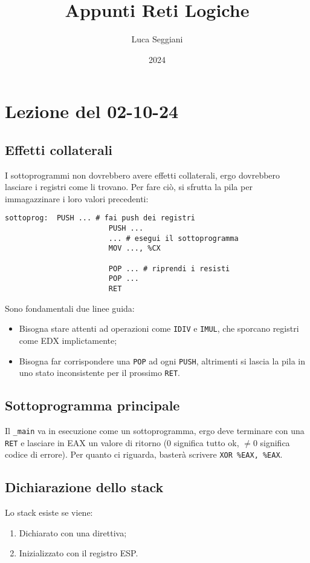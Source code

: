 \documentclass[a4paper,11pt]{article}
\title{Appunti Reti Logiche}
\author{Luca Seggiani}
\date{2024}
\begin{document}
\section{Lezione del 02-10-24}

\thispagestyle{empty}
\pagestyle{fancy}

\subsection{Effetti collaterali}
I sottoprogrammi non dovrebbero avere effetti collaterali, ergo dovrebbero lasciare i registri come li trovano.
Per fare ciò, si sfrutta la pila per immagazzinare i loro valori precedenti:
\begin{lstlisting}	
sottoprog:	PUSH ... # fai push dei registri
						PUSH ...
						...	# esegui il sottoprogramma
						MOV ..., %CX

						POP ... # riprendi i resisti
						POP ...
						RET
\end{lstlisting}

Sono fondamentali due linee guida:
\begin{itemize}
	\item Bisogna stare attenti ad operazioni come \lstinline|IDIV| e \lstinline|IMUL|, che sporcano registri come EDX implictamente;
	\item Bisogna far corrispondere una \lstinline|POP| ad ogni \lstinline|PUSH|, altrimenti si lascia la pila in uno stato inconsistente per il prossimo \lstinline|RET|.
\end{itemize}

\subsection{Sottoprogramma principale}
Il \lstinline|_main| va in esecuzione come un sottoprogramma, ergo deve terminare con una \lstinline|RET| e lasciare in EAX un valore di ritorno (0 significa tutto ok, $\neq0$ significa codice di errore).
Per quanto ci riguarda, basterà scrivere \lstinline|XOR %EAX, %EAX|.

\subsection{Dichiarazione dello stack}
Lo stack esiste se viene:
\begin{enumerate}
	\item Dichiarato con una direttiva;
	\item Inizializzato con il registro ESP.
\end{enumerate}
\end{document}
